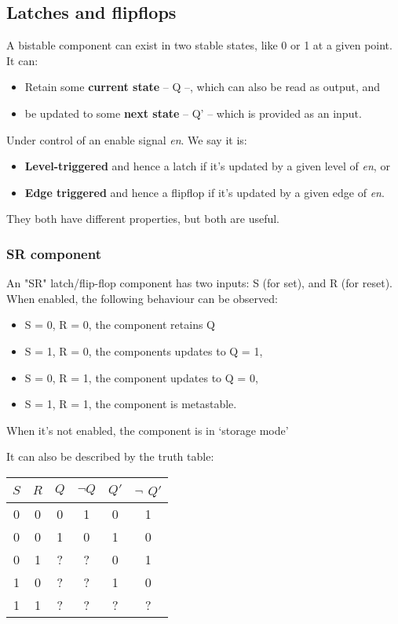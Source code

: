 \documentclass[11pt,a4paper,titlepage,dvipsnames,cmyk]{scrartcl}
\begin{document}
\subsection{Latches and flipflops}%
\label{sub:Latches}

A bistable component can exist in two stable states, like 0 or 1 at a
given point. It can:
\begin{itemize}
    \item Retain some \textbf{current state} -- Q --, which can also be read as
        output, and
    \item be updated to some \textbf{next state} -- Q' -- which is provided as an
        input.
\end{itemize}

Under control of an enable signal \textit{en}. We say it is:
\begin{itemize}
    \item \textbf{Level-triggered} and hence a latch if it's updated by a
        given level of \textit{en}, or
    \item \textbf{Edge triggered} and hence a flipflop if it's updated by
        a given edge of \textit{en}.
\end{itemize}

They both have different properties, but both are useful.

\subsubsection{SR component}%
\label{ssub:SR}
An "SR" latch/flip-flop component has two inputs: S (for set), and R (for
reset). When enabled, the following behaviour can be observed:
\begin{itemize}
    \item S = 0, R = 0, the component retains Q
    \item S = 1, R = 0, the components updates to Q = 1,
    \item S = 0, R = 1, the component updates to Q = 0,
    \item S = 1, R = 1, the component is metastable.
\end{itemize}

When it's not enabled, the component is in `storage mode'

It can also be described by the truth table:
\begin{center}
    \begin{tabular}{|c c|c c|c c|}
        \hline
        $S$ & $R$ & $Q$ & $\neg Q$ & $Q'$ & $\neg$ $Q'$ \\ \hline
        0 & 0 & 0 & 1 & 0 & 1 \\ \hline
        0 & 0 & 1 & 0 & 1 & 0 \\ \hline
        0 & 1 & ? & ? & 0 & 1 \\ \hline
        1 & 0 & ? & ? & 1 & 0 \\ \hline
        1 & 1 & ? & ? & ? & ? \\ \hline
    \end{tabular}
\end{center}
\end{document}
